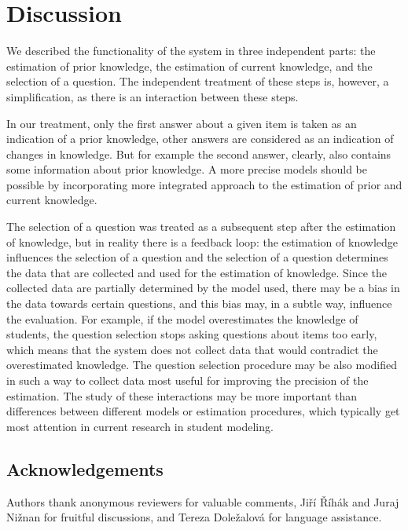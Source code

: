 \documentclass{edm_template}
\begin{document}
\section{Discussion}

We described the functionality of the system in three independent parts: the
estimation of prior knowledge, the estimation of current knowledge, and the
selection of a question. The independent treatment of these steps is, however,
a simplification, as there is an interaction between these steps.

In our treatment, only the first answer about a given item is taken as an
indication of a prior knowledge, other answers are considered as an indication
of changes in knowledge. But for example the second answer, clearly, also
contains some information about prior knowledge. A more precise models should
be possible by incorporating more integrated approach to the estimation of
prior and current knowledge.

The selection of a question was treated as a subsequent step after the
estimation of knowledge, but in reality there is a feedback loop: the
estimation of knowledge influences the selection of a question and the
selection of a question determines the data that are collected and used for the
estimation of knowledge. Since the collected data are partially determined by
the model used, there may be a bias in the data towards certain questions, and
this bias may, in a subtle way, influence the evaluation. For example, if the
model overestimates the knowledge of students, the question selection stops
asking questions about items too early, which means that the system does not
collect data that would contradict the overestimated knowledge. The question
selection procedure may be also modified in such a way to collect data most
useful for improving the precision of the estimation. The study of these
interactions may be more important than differences between different models or
estimation procedures, which typically get most attention in current research
in student modeling.



\subsection*{Acknowledgements}

Authors thank anonymous reviewers for valuable comments, Ji\v{r}\'i
\v{R}\'{i}h\'ak and Juraj Ni\v{z}nan for fruitful discussions, and Tereza
Dole\v{z}alov\'{a} for language assistance.


\end{document}
